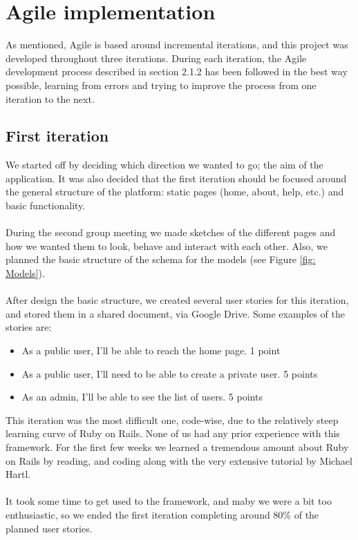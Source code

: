 
\section{Agile implementation}
\vspace{-5mm}
As mentioned, Agile is based around incremental iterations, and this project was \\developed throughout three iterations. During each iteration, the Agile development process described in section 2.1.2 has been followed in the best way possible, learning from errors and trying to improve the process from one iteration to the next.

\subsection{First iteration}
\vspace{-5mm}
We started off by deciding which direction we wanted to go; the aim of the application. It was also decided that the first iteration should be focused around the general structure of the platform: static pages (home, about, help, etc.) and basic functionality. \\\\
During the second group meeting we made sketches of the different pages and how we wanted them to look, behave and interact with each other. Also, we planned the basic structure of the schema for the models (see Figure \ref{fig: Models}).\\\\
After design the basic structure, we created several user stories for this iteration, and stored them in a shared document, via Google Drive. Some examples of the stories are:
\vspace{-5mm}
\begin{itemize} \setlength{\itemsep}{-5pt}
\item As a public user, I'll be able to reach the home page. 1 point
\item As a public user, I'll need to be able to create a private user. 5 points
\item As an admin, I'll be able to see the list of users. 5 points
\end{itemize}
\pagebreak
This iteration was the most difficult one, code-wise, due to the relatively steep learning curve of Ruby on Rails. None of us had any prior experience with this framework. For the first few weeks we learned a tremendous amount about Ruby on Rails by reading, and coding along with the very extensive tutorial by Michael Hartl\cite{hartl}.\\\\
It took some time to get used to the framework, and maby we were a bit too enthusiastic, so we ended the first iteration completing around 80\% of the planned user stories.

